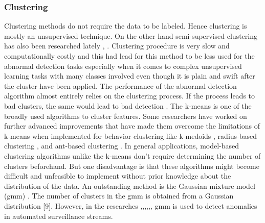 \documentclass[a4paper,12pt]{report}
\begin{document}
\begin{itemize}
\subsubsection{Clustering}
Clustering methods do not require the data to be labeled. Hence clustering is mostly an unsupervised technique. On the other hand semi-supervised clustering has also been researched lately \cite{109}, \cite{110}. Clustering procedure is very slow and computationally costly and this had lead for this method to be less used for the abnormal detection tasks especially when it comes to complex unsupervised learning tasks with many classes involved even though it is plain and swift after the cluster have been applied. The performance of the abnormal detection algorithm almost entirely relies on the clustering process. If the process leads to bad clusters, the same would lead to bad detection \cite{111}.
The k-means is one of the  broadly used algorithms to cluster features. Some researchers have worked on further advanced improvements that have made them overcome the limitations of k-means when implemented for behavior clustering like k-medoids \cite{88}, radius-based clustering \cite{112}, and ant-based clustering \cite{113}.
In general applications, model-based clustering algorithms unlike the k-means don't require determining the number of clusters beforehand. But one disadvantage is that these algorithms might become difficult and unfeasible to implement without prior knowledge about the distribution of the data. An outstanding method is the Gaussian mixture model (\gls{gmm}) \cite{116}. The number of clusters in the \gls{gmm} is obtained from a Gaussian distribution [9]. However, in the researches \cite{47},\cite{117},\cite{118},\cite{119},\cite{120},\cite{121}, \gls{gmm} is used to detect anomalies in automated surveillance streams. 


\end{itemize}
\end{document}
